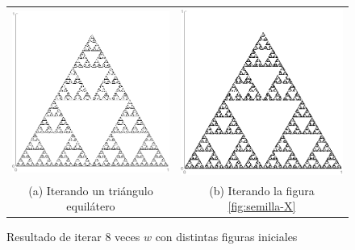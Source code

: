 \begin{figure}[ht]
    \centering
    \begin{tabular}{cc}
      \includegraphics[scale=0.33]{./img/C4/triangulo-iterado.png} &   \includegraphics[scale=0.33]{./img/C4/figura-X-iterada.png} \\
    (a) Iterando un triángulo equilátero & (b) Iterando la figura \ref{fig:semilla-X} 
    \end{tabular}
    \caption{Resultado de iterar 8 veces $w$ con distintas figuras iniciales}
    \label{fig:semillas-sfi}
\end{figure}

